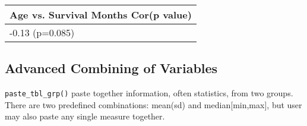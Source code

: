 \documentclass[table]{article}
\newenvironment{Shaded}{\begin{snugshade}}{\end{snugshade}}
\newcommand{\DataTypeTok}[1]{\textcolor[rgb]{0.13,0.29,0.53}{#1}}
\newcommand{\DecValTok}[1]{\textcolor[rgb]{0.00,0.00,0.81}{#1}}
\newcommand{\KeywordTok}[1]{\textcolor[rgb]{0.13,0.29,0.53}{\textbf{#1}}}
\newcommand{\NormalTok}[1]{#1}
\newcommand{\OperatorTok}[1]{\textcolor[rgb]{0.81,0.36,0.00}{\textbf{#1}}}
\newcommand{\OtherTok}[1]{\textcolor[rgb]{0.56,0.35,0.01}{#1}}
\newcommand{\StringTok}[1]{\textcolor[rgb]{0.31,0.60,0.02}{#1}}
\begin{document}
\begin{Shaded}
\end{Shaded}

\begin{tabular}{l}
\hline
Age vs. Survival Months Cor(p value)\\
\hline
-0.13 (p=0.085)\\
\hline
\end{tabular}

\clearpage

\hypertarget{advanced-combining-of-variables}{%
\subsection{Advanced Combining of
Variables}\label{advanced-combining-of-variables}}

\texttt{paste\_tbl\_grp()} paste together information, often statistics,
from two groups. There are two predefined combinations: mean(sd) and
median{[}min,max{]}, but user may also paste any single measure
together.
\end{document}
